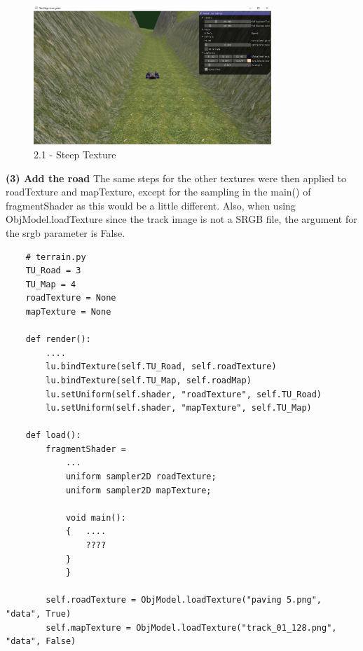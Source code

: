 \documentclass[a4 paper, 12pt]{article}
\begin{document}
    \begin{figure} [H]
        \centering
        \includegraphics[width=0.8\textwidth, frame]
            {./images/2.1_b.PNG}
        \caption{2.1 - Steep Texture}   
    \end{figure}




\textbf{(3) Add the road}
The same steps for the other textures were then applied to roadTexture and mapTexture, except for the sampling in the main() of fragmentShader as this would be a little different. Also, when using ObjModel.loadTexture since the track image is not a SRGB file, the argument for the srgb parameter is False. 
\begin{lstlisting}
    # terrain.py
    TU_Road = 3
    TU_Map = 4
    roadTexture = None
    mapTexture = None

    def render():
        ....
        lu.bindTexture(self.TU_Road, self.roadTexture)
        lu.bindTexture(self.TU_Map, self.roadMap)
        lu.setUniform(self.shader, "roadTexture", self.TU_Road)
        lu.setUniform(self.shader, "mapTexture", self.TU_Map)

    def load():
        fragmentShader = 
            ...
            uniform sampler2D roadTexture;
            uniform sampler2D mapTexture;

            void main():
            {   ....
                ????
            }
            }
        
        self.roadTexture = ObjModel.loadTexture("paving 5.png", "data", True)
        self.mapTexture = ObjModel.loadTexture("track_01_128.png", "data", False)
\end{lstlisting}
\end{document}
